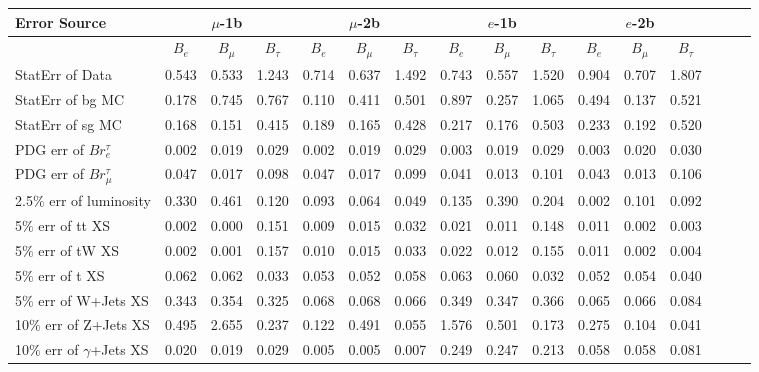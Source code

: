 
      \begin{tabular}{|l|ccc|ccc|ccc|ccc|ccc|}
      \hline
      Error Source & \multicolumn{3}{c|}{$\mu$-1b} & \multicolumn{3}{c|}{$\mu$-2b} & \multicolumn{3}{c|}{$e$-1b} & \multicolumn{3}{c|}{$e$-2b} \\
      \hline
                    & $B_e$ & $B_\mu$ & $B_\tau$ & $B_e$ & $B_\mu$ & $B_\tau$ & $B_e$ & $B_\mu$ & $B_\tau$ & $B_e$ & $B_\mu$ & $B_\tau$ \\
      \hline
      StatErr of Data                            & 0.543 & 0.533 & 1.243 & 0.714 & 0.637 & 1.492 & 0.743 & 0.557 & 1.520 & 0.904 & 0.707 & 1.807 \\ 
      StatErr of bg MC                           & 0.178 & 0.745 & 0.767 & 0.110 & 0.411 & 0.501 & 0.897 & 0.257 & 1.065 & 0.494 & 0.137 & 0.521 \\ 
      StatErr of sg MC                           & 0.168 & 0.151 & 0.415 & 0.189 & 0.165 & 0.428 & 0.217 & 0.176 & 0.503 & 0.233 & 0.192 & 0.520 \\ 
      \hline
      PDG err of $Br^\tau_e$                     & 0.002 & 0.019 & 0.029 & 0.002 & 0.019 & 0.029 & 0.003 & 0.019 & 0.029 & 0.003 & 0.020 & 0.030 \\ 
      PDG err of $Br^\tau_\mu$                   & 0.047 & 0.017 & 0.098 & 0.047 & 0.017 & 0.099 & 0.041 & 0.013 & 0.101 & 0.043 & 0.013 & 0.106 \\ 
      2.5$\%$ err of luminosity                  & 0.330 & 0.461 & 0.120 & 0.093 & 0.064 & 0.049 & 0.135 & 0.390 & 0.204 & 0.002 & 0.101 & 0.092 \\ 
      5$\%$ err of tt XS                         & 0.002 & 0.000 & 0.151 & 0.009 & 0.015 & 0.032 & 0.021 & 0.011 & 0.148 & 0.011 & 0.002 & 0.003 \\ 
      5$\%$ err of tW XS                         & 0.002 & 0.001 & 0.157 & 0.010 & 0.015 & 0.033 & 0.022 & 0.012 & 0.155 & 0.011 & 0.002 & 0.004 \\ 
      5$\%$ err of t XS                          & 0.062 & 0.062 & 0.033 & 0.053 & 0.052 & 0.058 & 0.063 & 0.060 & 0.032 & 0.052 & 0.054 & 0.040 \\ 
      5$\%$ err of W+Jets XS                     & 0.343 & 0.354 & 0.325 & 0.068 & 0.068 & 0.066 & 0.349 & 0.347 & 0.366 & 0.065 & 0.066 & 0.084 \\ 
      10$\%$ err of Z+Jets XS                    & 0.495 & 2.655 & 0.237 & 0.122 & 0.491 & 0.055 & 1.576 & 0.501 & 0.173 & 0.275 & 0.104 & 0.041 \\ 
      10$\%$ err of $\gamma$+Jets XS             & 0.020 & 0.019 & 0.029 & 0.005 & 0.005 & 0.007 & 0.249 & 0.247 & 0.213 & 0.058 & 0.058 & 0.081 \\ 

\end{tabular}
